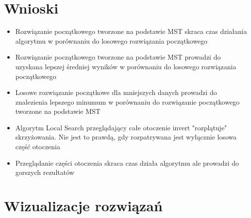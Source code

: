 \documentclass{article}
\begin{document}
\section{Wnioski}
\begin{itemize}
    \item Rozwiązanie początkowego tworzone na podstawie MST skraca czas działania algorytmu w porównaniu do losowego rozwiązania początkowego
    \item Rozwiązanie początkowego tworzone na podstawie MST prowadzi do uzyskana lepszej średniej wyników w porównaniu do losowego rozwiązania początkowego
    \item Losowe rozwiązanie początkowe dla mniejszych danych prowadzi do znalezienia lepszego minumum w porównaniu do rozwiązanie początkowego tworzone na podstawie MST
    \item Algorytm Local Search przeglądający całe otoczenie invert "rozplątuje" skrzyżowania. Nie jest to prawdą, gdy rozpatrywana jest wyłącznie losowa część otoczenia
    \item Przeglądanie części otoczenia skraca czas działa algorytmu ale prowadzi do gorszych rezultatów
\end{itemize}

\newpage

\section{Wizualizacje rozwiązań}
\def \myArray{xqf131, xqg237, pma343, pka379, bcl380, pbl395, pbk411, pbn423, pbm436, xql662, xit1083, icw1483, djc1785, dcb2086, pds2566}
\end{document}
